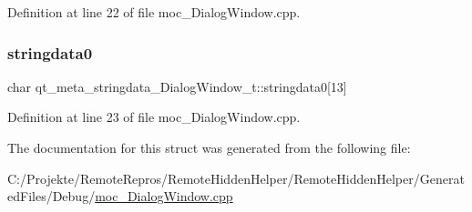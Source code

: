 Definition at line 22 of file moc\+\_\+\+Dialog\+Window.\+cpp.

\hypertarget{structqt__meta__stringdata___dialog_window__t_a4125b0e6f5ad0b8b506d3296217a3b5b}{}\label{structqt__meta__stringdata___dialog_window__t_a4125b0e6f5ad0b8b506d3296217a3b5b} 
\subsubsection{\texorpdfstring{stringdata0}{stringdata0}}
{\footnotesize\ttfamily char qt\+\_\+meta\+\_\+stringdata\+\_\+\+Dialog\+Window\+\_\+t\+::stringdata0\mbox{[}13\mbox{]}}



Definition at line 23 of file moc\+\_\+\+Dialog\+Window.\+cpp.



The documentation for this struct was generated from the following file\+:\begin{DoxyCompactItemize}
\item 
C\+:/\+Projekte/\+Remote\+Repros/\+Remote\+Hidden\+Helper/\+Remote\+Hidden\+Helper/\+Generated\+Files/\+Debug/\hyperlink{moc___dialog_window_8cpp}{moc\+\_\+\+Dialog\+Window.\+cpp}\end{DoxyCompactItemize}
